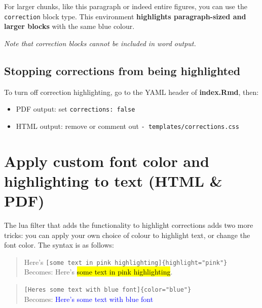 \documentclass[a4paper, twoside]{templates/ociamthesis}
\providecommand{\tightlist}{%
  \setlength{\itemsep}{0pt}\setlength{\parskip}{0pt}}
\theoremstyle{definition}
\theoremstyle{definition}
\theoremstyle{definition}
\theoremstyle{definition}
\theoremstyle{remark}
\begin{document}
\begin{correction}
For larger chunks, like this paragraph or indeed entire figures, you can
use the \texttt{correction} block type. This environment
\textbf{highlights paragraph-sized and larger blocks} with the same blue
colour.
\end{correction}

\emph{Note that correction blocks cannot be included in word output.}

\hypertarget{stopping-corrections-from-being-highlighted}{%
\subsection{Stopping corrections from being highlighted}\label{stopping-corrections-from-being-highlighted}}

To turn off correction highlighting, go to the YAML header of \textbf{index.Rmd}, then:

\begin{itemize}
\tightlist
\item
  PDF output: set \texttt{corrections:\ false}\\
\item
  HTML output: remove or comment out \texttt{-\ templates/corrections.css}
\end{itemize}

\hypertarget{apply-custom-font-color-and-highlighting-to-text-html-pdf}{%
\section{Apply custom font color and highlighting to text (HTML \& PDF)}\label{apply-custom-font-color-and-highlighting-to-text-html-pdf}}

The lua filter that adds the functionality to highlight corrections adds two more tricks:
you can apply your own choice of colour to highlight text, or change the font color.
The syntax is as follows:

\begin{quote}
Here's \texttt{{[}some\ text\ in\ pink\ highlighting{]}\{highlight="pink"\}}\\
Becomes: Here's \hl{some text in pink highlighting}.
\end{quote}

\begin{quote}
\texttt{{[}Here\textquotesingle{}s\ some\ text\ with\ blue\ font{]}\{color="blue"\}}~\\
Becomes: \textcolor{blue}{Here's some text with blue font}
\end{quote}
\end{document}
